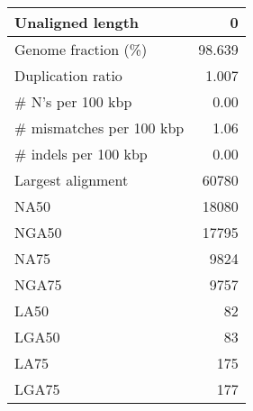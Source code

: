 \documentclass[12pt,a4paper]{article}
\begin{document}
\begin{table}[ht]
\begin{center}
\begin{tabular}{|l*{1}{|r}|}
Unaligned length & 0 \\ \hline
Genome fraction (\%) & 98.639 \\ \hline
Duplication ratio & 1.007 \\ \hline
\# N's per 100 kbp & 0.00 \\ \hline
\# mismatches per 100 kbp & 1.06 \\ \hline
\# indels per 100 kbp & 0.00 \\ \hline
Largest alignment & 60780 \\ \hline
NA50 & 18080 \\ \hline
NGA50 & 17795 \\ \hline
NA75 & 9824 \\ \hline
NGA75 & 9757 \\ \hline
LA50 & 82 \\ \hline
LGA50 & 83 \\ \hline
LA75 & 175 \\ \hline
LGA75 & 177 \\ \hline
\end{tabular}
\end{center}
\end{table}
\end{document}

